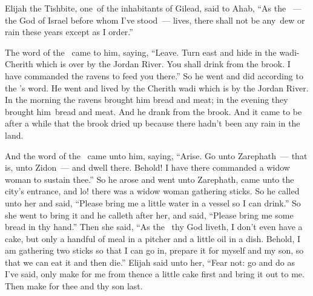 
\begin{inparaenum}
   Elijah the Tishbite, one\understood{}\ of the inhabitants of Gilead, said to Ahab, ``As the \lord~--- the God of Israel before whom I've stood~--- lives, there shall not be any\understood{}\ dew or rain these years except as I order.''%

   The word of the \lord\ came to him, saying,%
   ``Leave. Turn east and hide in the wadi-Cherith which is over by the Jordan River.\understood{}%
   You shall drink from the brook. I have commanded the ravens to feed you there.''%
   So he went and did according to the \lord's word. He went and lived by the Cherith wadi which is by the Jordan River.%
   In the morning the ravens brought him bread and meat; in the evening they brought him\understood{}\ bread and meat. And he drank from the brook.%
   And it came to be after a while that the brook dried up because there hadn't been any rain in the land.%

   And the word of the \lord\ came unto him, saying,%
   ``Arise. Go unto Zarephath~--- that is, unto Zidon~--- and dwell there. Behold! I have there commanded a widow woman to sustain thee.''%
   So he arose and went unto Zarephath, came unto the city's entrance, and lo! there was a widow woman gathering sticks. So he called unto her and said, ``Please bring me a little water in a vessel so I can drink.''%
   So she went to bring it and he calleth after her, and said, ``Please bring me some bread in thy hand.''%
   Then she said, ``As the \lord\ thy God liveth, I don't even have a cake, but only a handful of meal in a pitcher and a little oil in a dish. Behold, I am gathering two sticks so that I can go in, prepare it for myself and my son, so that we can eat it and then die.''%
   Elijah said unto her, ``Fear not: go and do as I've said, only make for me from thence a little cake first and bring it out to me. Then make for thee and thy son last.%


\end{inparaenum}
